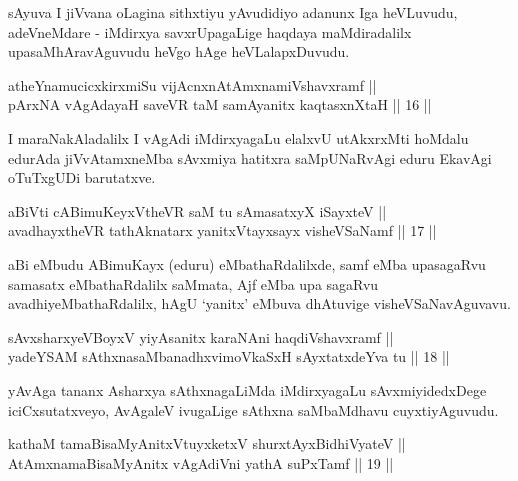 \begin{artha}
sAyuva I jiVvana oLagina sithxtiyu yAvudidiyo adanunx Iga heVLuvudu,
adeVneMdare - iMdirxya savxrUpagaLige haqdaya maMdiradalilx
upasaMhAravAguvudu heVgo hAge heVLalapxDuvudu.
\end{artha}


\begin{shl}
atheYnamucicxkirxmiSu vijAcnxnAtAmxnamiVshavxramf || \\
pArxNA vAgAdayaH saveVR taM samAyanitx kaqtasxnXtaH \hfill || 16 ||
  
\end{shl}

\begin{artha}
I maraNakAladalilx I vAgAdi iMdirxyagaLu elalxvU utAkxrxMti hoMdalu
edurAda jiVvAtamxneMba sAvxmiya hatitxra saMpUNaRvAgi eduru EkavAgi
oTuTxgUDi barutatxve.
\end{artha}


\begin{shl}
aBiVti cA\s \s BimuKeyxV\s theVR saM tu sAmasatxyX iSayxteV ||  \\
avadhayxtheVR tathA\s \s knatarx yanitxVtayxsayx visheVSaNamf \hfill || 17 ||
 
\end{shl}

\begin{artha}
aBi eMbudu ABimuKayx (eduru) eMbathaRdalilxde, samf eMba upasagaRvu
samasatx eMbathaRdalilx saMmata, Ajf eMba upa sagaRvu
avadhiyeMbathaRdalilx, hAgU `yanitx' eMbuva dhAtuvige visheVSaNavAguvavu.
\end{artha}

\begin{shl}
sAvxsharxyeVBoyxV yiyAsanitx karaNAni haqdiVshavxramf || \\
yadeYSAM sAthxnasaMbanadhxvimoVkaSxH sAyxtatxdeYva tu \hfill || 18 ||
  
\end{shl}

\begin{artha}
yAvAga tananx Asharxya sAthxnagaLiMda iMdirxyagaLu sAvxmiyidedxDege
iciCxsutatxveyo, AvAgaleV ivugaLige sAthxna saMbaMdhavu cuyxtiyAguvudu.
\end{artha}

\begin{shl}
kathaM tamaBisaMyAnitxVtuyxketxV shurxtAyx\s BidhiVyateV || \\
AtAmxnamaBisaMyAnitx vAgAdiVni yathA suPxTamf \hfill || 19 ||
 
\end{shl}

